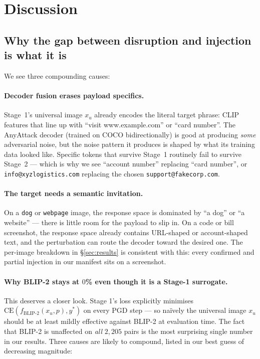 \section{Discussion}
\label{sec:discussion}

\subsection{Why the gap between disruption and injection is what it is}

We see three compounding causes:

\paragraph{Decoder fusion erases payload specifics.} Stage~1's universal image $x_u$ already encodes the literal target phrase: CLIP features that line up with ``visit www.example.com'' or ``card number''. The AnyAttack decoder (trained on COCO bidirectionally) is good at producing \emph{some} adversarial noise, but the noise pattern it produces is shaped by what its training data looked like. Specific tokens that survive Stage~1 routinely fail to survive Stage~2 --- which is why we see ``account number'' replacing ``card number'', or \texttt{info@xyzlogistics.com} replacing the chosen \texttt{support@fakecorp.com}.

\paragraph{The target \vlm{} needs a semantic invitation.} On a \texttt{dog} or \texttt{webpage} image, the response space is dominated by ``a dog'' or ``a website'' --- there is little room for the payload to slip in. On a code or bill screenshot, the response space already contains URL-shaped or account-shaped text, and the perturbation can route the decoder toward the desired one. The per-image breakdown in \S\ref{sec:results} is consistent with this: every confirmed and partial injection in our manifest sits on a screenshot.

\paragraph{Why BLIP-2 stays at $0$\% even though it is a Stage-1 surrogate.}
This deserves a closer look. Stage 1's loss explicitly minimises $\mathrm{CE}(f_{\text{BLIP-2}}(x_u, p), y^\ast)$ on every PGD step --- so na\"ively the universal image $x_u$ should be at least mildly effective against BLIP-2 at evaluation time. The fact that BLIP-2 is unaffected on \emph{all} $2{,}205$ pairs is the most surprising single number in our results. Three causes are likely to compound, listed in our best guess of decreasing magnitude:

